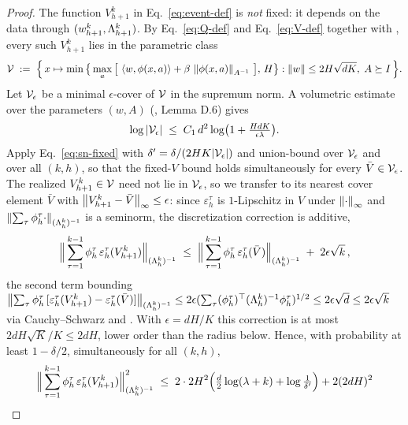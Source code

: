 \begin{proof}
The function $V_{h+1}^k$ in Eq.~\eqref{eq:event-def} is \emph{not} fixed: it
depends on the data through $(w_{h+1}^k,\Lambda_{h+1}^k)$. By
Eq.~\eqref{eq:Q-def} and Eq.~\eqref{eq:V-def} together with
, every such
$V_{h+1}^k$ lies in the parametric class
\begin{align*}
\mathcal{V} \;:=\; \Big\{\, x\mapsto \min\big\{\max_a \big[\, \left\langle w, \phi(x,a) \right\rangle + \beta\,\left\| \phi(x,a) \right\|_{A^{-1}} \,\big],\,H\big\} : \left\| w \right\|\le 2H\sqrt{dK},\; A\succeq I \,\Big\}.
\end{align*}
Let $\mathcal{V}_\epsilon$ be a minimal $\epsilon$-cover of $\mathcal{V}$ in the supremum
norm. A volumetric estimate over the parameters $(w,A)$ (\cite{jin2020provably},
Lemma D.6) gives
\begin{align}\label{eq:cover}
\log|\mathcal{V}_\epsilon| \;\le\; C_1\, d^2 \log\!\big( 1 + \tfrac{HdK}{\epsilon\lambda} \big) .
\end{align}
Apply Eq.~\eqref{eq:sn-fixed} with $\delta'=\delta/(2HK|\mathcal{V}_\epsilon|)$ and
union-bound over $\mathcal{V}_\epsilon$ and over all $(k,h)$, so that the fixed-$V$
bound holds simultaneously for every $\bar V\in\mathcal{V}_\epsilon$. The realized
$V_{h+1}^k\in\mathcal{V}$ need not lie in $\mathcal{V}_\epsilon$, so we transfer to its nearest
cover element $\bar V$ with $\left\| V_{h+1}^k-\bar V \right\|_\infty\le\epsilon$: since
$\varepsilon_h^\tau$ is $1$-Lipschitz in $V$ under $\left\| \cdot \right\|_\infty$ and
$\left\| \sum_\tau\phi_h^\tau\cdot \right\|_{(\Lambda_h^k)^{-1}}$ is a seminorm, the
discretization correction is additive,
\begin{align*}
\Big\| \sum_{\tau=1}^{k-1} \phi_h^\tau\, \varepsilon_h^\tau(V_{h+1}^k) \Big\|_{(\Lambda_h^k)^{-1}}
\;\le\; \Big\| \sum_{\tau=1}^{k-1} \phi_h^\tau\, \varepsilon_h^\tau(\bar V) \Big\|_{(\Lambda_h^k)^{-1}}
\;+\; 2\epsilon\sqrt{k}\,,
\end{align*}
the second term bounding $\left\| \sum_\tau\phi_h^\tau\,[\varepsilon_h^\tau
(V_{h+1}^k)-\varepsilon_h^\tau(\bar V)] \right\|_{(\Lambda_h^k)^{-1}}\le 2\epsilon
(\sum_\tau(\phi_h^\tau)^\top(\Lambda_h^k)^{-1}\phi_h^\tau)^{1/2}\le
2\epsilon\sqrt{d}\le 2\epsilon\sqrt k$ via Cauchy--Schwarz and
. With $\epsilon=dH/K$ this correction is at most
$2dH\sqrt K/K\le 2dH$, lower order than the radius below. Hence, with
probability at least $1-\delta/2$, simultaneously for all $(k,h)$,
\begin{align*}
\Big\| \sum_{\tau=1}^{k-1} \featmap_h^\tau\, \varepsilon_h^\tau(V_{h+1}^k) \Big\|_{(\Gram_h^k)^{-1}}^2
&\;\le\; 2\cdot 2H^2\Big( \tfrac{d}{2}\log(\lambda+k) + \log\tfrac{1}{\delta'} \Big) + 2(2dH)^2 \\

\end{align*}
\end{proof}
